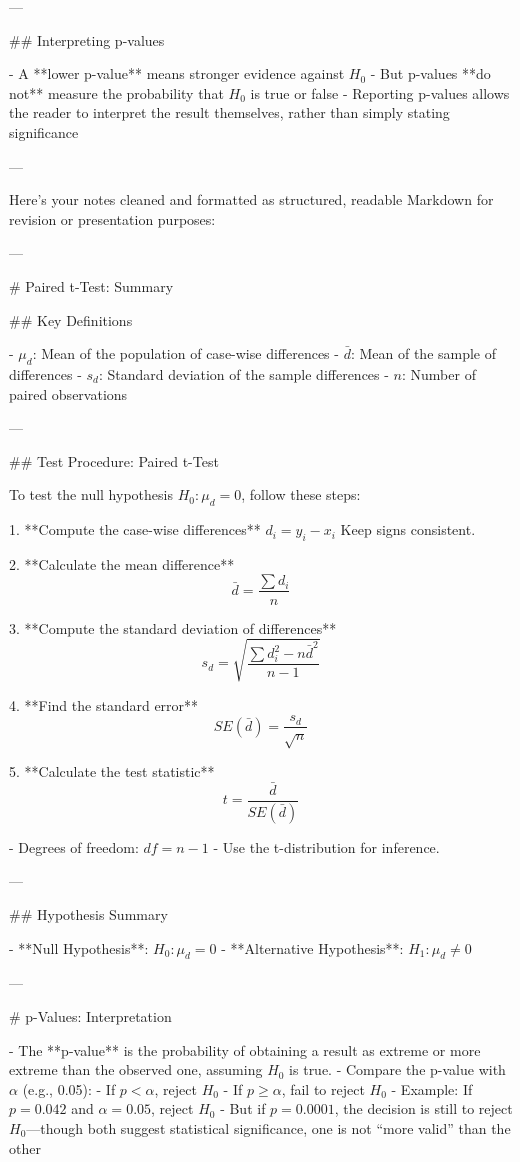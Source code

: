 ---

## Interpreting p-values

- A **lower p-value** means stronger evidence against \( H_0 \)
- But p-values **do not** measure the probability that \( H_0 \) is true or false
- Reporting p-values allows the reader to interpret the result themselves, rather than simply stating significance

---





Here’s your notes cleaned and formatted as structured, readable Markdown for revision or presentation purposes:

---

# Paired t-Test: Summary

## Key Definitions

- \( \mu_d \): Mean of the population of case-wise differences  
- \( \bar{d} \): Mean of the sample of differences  
- \( s_d \): Standard deviation of the sample differences  
- \( n \): Number of paired observations  

---

## Test Procedure: Paired t-Test

To test the null hypothesis \( H_0: \mu_d = 0 \), follow these steps:

1. **Compute the case-wise differences**  
   \( d_i = y_i - x_i \)  
   Keep signs consistent.

2. **Calculate the mean difference**  
   \[
   \bar{d} = \frac{\sum d_i}{n}
   \]

3. **Compute the standard deviation of differences**  
   \[
   s_d = \sqrt{ \frac{\sum d_i^2 - n\bar{d}^2}{n - 1} }
   \]

4. **Find the standard error**  
   \[
   SE(\bar{d}) = \frac{s_d}{\sqrt{n}}
   \]

5. **Calculate the test statistic**  
   \[
   t = \frac{\bar{d}}{SE(\bar{d})}
   \]

- Degrees of freedom: \( df = n - 1 \)
- Use the t-distribution for inference.

---

## Hypothesis Summary

- **Null Hypothesis**: \( H_0: \mu_d = 0 \)  
- **Alternative Hypothesis**: \( H_1: \mu_d \neq 0 \)

---

# p-Values: Interpretation

- The **p-value** is the probability of obtaining a result as extreme or more extreme than the observed one, assuming \( H_0 \) is true.
- Compare the p-value with \( \alpha \) (e.g., 0.05):
  - If \( p < \alpha \), reject \( H_0 \)
  - If \( p \geq \alpha \), fail to reject \( H_0 \)
- Example: If \( p = 0.042 \) and \( \alpha = 0.05 \), reject \( H_0 \)
  - But if \( p = 0.0001 \), the decision is still to reject \( H_0 \)—though both suggest statistical significance, one is not “more valid” than the other

